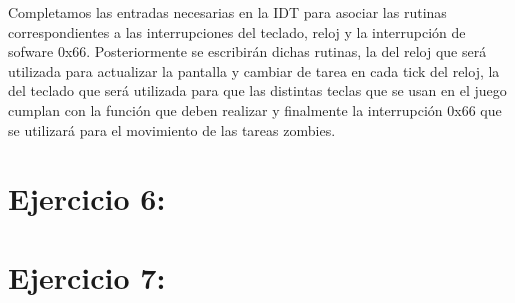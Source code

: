 \documentclass[a4paper]{article}
\begin{document}
Completamos las entradas necesarias en la IDT para asociar las rutinas correspondientes a las interrupciones del teclado, reloj y la interrupción de sofware 0x66. Posteriormente se escribirán dichas rutinas, la del reloj que será utilizada para actualizar la pantalla y cambiar de tarea en cada tick del reloj, la del teclado que será utilizada para que las distintas teclas que se usan en el juego cumplan con la función que deben realizar y finalmente la interrupción 0x66 que se utilizará para el movimiento de las tareas zombies.

\clearpage

\section{Ejercicio 6:}


\clearpage

\section{Ejercicio 7:}
\end{document}
